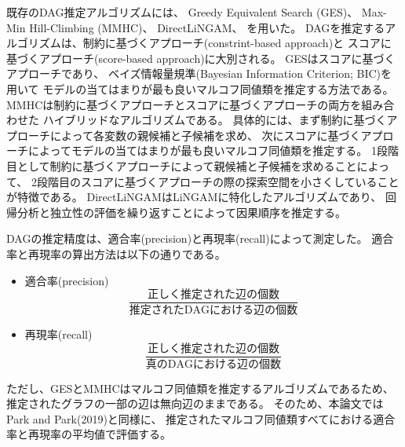 既存のDAG推定アルゴリズムには、
Greedy Equivalent Search (GES)\cite{Chickering2002-iq}、
Max-Min Hill-Climbing (MMHC)\cite{Tsamardinos2006-qe}、
DirectLiNGAM\cite{Shimizu2011-pd}、
を用いた。
DAGを推定するアルゴリズムは、制約に基づくアプローチ(constrint-based approach)と
スコアに基づくアプローチ(score-based approach)に大別される。
GESはスコアに基づくアプローチであり、
ベイズ情報量規準(Bayesian Information Criterion; BIC)を用いて
モデルの当てはまりが最も良いマルコフ同値類を推定する方法である。
MMHCは制約に基づくアプローチとスコアに基づくアプローチの両方を組み合わせた
ハイブリッドなアルゴリズムである。
具体的には、まず制約に基づくアプローチによって各変数の親候補と子候補を求め、
次にスコアに基づくアプローチによってモデルの当てはまりが最も良いマルコフ同値類を推定する。
1段階目として制約に基づくアプローチによって親候補と子候補を求めることによって、
2段階目のスコアに基づくアプローチの際の探索空間を小さくしていることが特徴である。
DirectLiNGAMはLiNGAM\cite{Shimizu2006-yu}に特化したアルゴリズムであり、
回帰分析と独立性の評価を繰り返すことによって因果順序を推定する。

DAGの推定精度は、適合率(precision)と再現率(recall)によって測定した。
適合率と再現率の算出方法は以下の通りである。
\begin{itemize}
  \item 適合率(precision)
  \begin{equation*}
    \frac{\text{正しく推定された辺の個数}}{\text{推定されたDAGにおける辺の個数}}
  \end{equation*}

  \item 再現率(recall)
  \begin{equation*}
    \frac{\text{正しく推定された辺の個数}}{\text{真のDAGにおける辺の個数}}
  \end{equation*}
\end{itemize}
ただし、GESとMMHCはマルコフ同値類を推定するアルゴリズムであるため、
推定されたグラフの一部の辺は無向辺のままである。
そのため、本論文ではPark and Park(2019)\cite{Park2019-qy}と同様に、
推定されたマルコフ同値類すべてにおける適合率と再現率の平均値で評価する。
